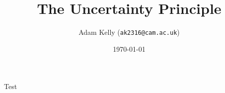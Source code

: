 \documentclass[a4paper]{article}
\title{The Uncertainty Principle}
\author{Adam Kelly (\texttt{ak2316@cam.ac.uk})}
\date{\today}
\begin{document}
\maketitle



Test
\end{document}
